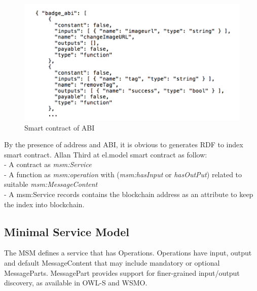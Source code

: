 \begin{center}
	\begin{figure}[htb!]
		
		\begin{minipage}{0.55\linewidth}
			\centering
			\includegraphics[width=1.95\textwidth]{images/chap02_SmartContract_ABI.png}
		\end{minipage}
		\caption[Smart contract of ABI]{Smart  contract of ABI}
		
	\end{figure}
	
\end{center}
By the presence of address and ABI, it is obvious to generates RDF to index smart contract.
Allan Third at el.\cite{Third}model smart contract as follow:\\
- A contract as \textit{msm:Service}\\
- A function as \textit{msm:operation} with (\textit{msm:hasInput} or \textit{hasOutPut}) related to suitable \textit{msm:MessageContent}\\
- A msm:Service records contains the blockchain address as an attribute to keep the index into blockchain.

\subsection{Minimal Service Model}
The MSM defines a service that has Operations. Operations have input, output and default MessageContent that may include mandatory or optional MessageParts. MessagePart provides support for finer-grained input/output discovery, as available in OWL-S and WSMO\cite{Rashid}.


